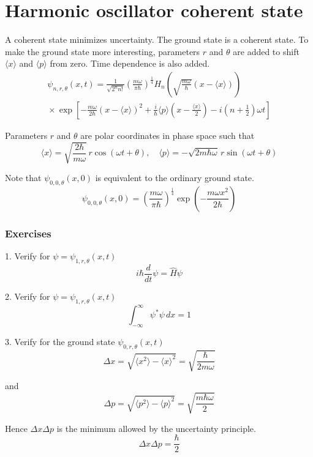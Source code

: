 

\section*{Harmonic oscillator coherent state}

A coherent state minimizes uncertainty.
The ground state is a coherent state.
To make the ground state more interesting, parameters $r$ and $\theta$ are added
to shift $\langle x\rangle$ and $\langle p\rangle$ from zero.
Time dependence is also added.
\begin{multline*}
\psi_{n,r,\theta}(x,t)
=\frac{1}{\sqrt{2^nn!}}
\left(\frac{m\omega}{\pi\hbar}\right)^\frac{1}{4}
H_n\left(\sqrt{\frac{m\omega}{\hbar}}\left(x-\langle x\rangle\right)\right)
\\{}\times
\exp\left[
-\frac{m\omega}{2\hbar}\left(x-\langle x\rangle\right)^2
+\frac{i}{\hbar}\langle p\rangle\left(x-\frac{\langle x\rangle}{2}\right)
-i\left(n+\frac{1}{2}\right)\omega t
\right]
\end{multline*}

Parameters $r$ and $\theta$ are polar coordinates in phase space such that
\begin{equation*}
\langle x\rangle=\sqrt{\frac{2\hbar}{m\omega}}\,r\cos(\omega t+\theta),\quad
\langle p\rangle=-\sqrt{2m\hbar\omega}\,r\sin(\omega t+\theta)
\end{equation*}

Note that $\psi_{0,0,\theta}(x,0)$ is equivalent to the ordinary ground state.
\begin{equation*}
\psi_{0,0,\theta}(x,0)=\left(\frac{m\omega}{\pi\hbar}\right)^\frac{1}{4}
\exp\left(-\frac{m\omega x^2}{2\hbar}\right)
\end{equation*}

\subsubsection*{Exercises}

1. Verify for $\psi=\psi_{1,r,\theta}(x,t)$
\begin{equation*}
i\hbar\frac{d}{dt}\psi=\hat H\psi
\end{equation*}

2. Verify for $\psi=\psi_{1,r,\theta}(x,t)$
\begin{equation*}
\int_{-\infty}^\infty\psi^*\psi\,dx=1
\end{equation*}

3. Verify for the ground state $\psi_{0,r,\theta}(x,t)$
\begin{equation*}
\Delta x=\sqrt{\langle x^2\rangle-\langle x\rangle^2}
=\sqrt{\frac{\hbar}{2m\omega}}
\end{equation*}

and
\begin{equation*}
\Delta p=\sqrt{\langle p^2\rangle-\langle p\rangle^2}
=\sqrt{\frac{m\hbar\omega}{2}}
\end{equation*}

Hence $\Delta x\Delta p$ is the minimum allowed by the uncertainty principle.
\begin{equation*}
\Delta x\Delta p=\frac{\hbar}{2}
\end{equation*}


